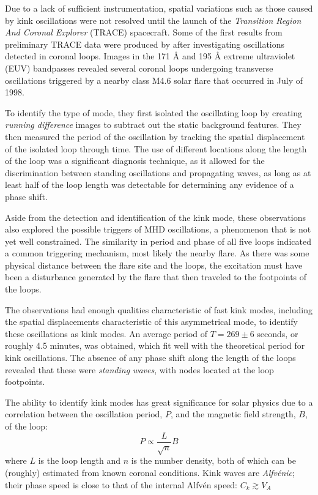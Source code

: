 \documentclass[preprint2]{aastex}
\begin{document}
Due to a lack of sufficient instrumentation,
spatial variations such as those caused by kink oscillations
were not resolved until the launch of the \emph{Transition Region And
Coronal Explorer} (TRACE) spacecraft.
Some of the first results from preliminary TRACE data were produced by
\cite{kink_1} after investigating oscillations detected in coronal loops.
Images in the 171 \AA{} and 195 \AA{} extreme ultraviolet (EUV) bandpasses
revealed several coronal loops undergoing transverse oscillations
triggered by a nearby class M4.6 solar flare that occurred in July of 1998.

To identify the type of mode, they first isolated the oscillating
loop by creating \emph{running difference} images to subtract out
the static background features. They then measured the period
of the oscillation by tracking the spatial displacement of the
isolated loop through time. The use of different locations along the
length of the loop was a significant diagnosis technique, as it
allowed for the discrimination between standing oscillations
and propagating waves, as long as at least half of the loop length
was detectable for determining any evidence of a phase shift.

Aside from the detection and identification of the kink mode,
these observations also explored the possible triggers of MHD
oscillations, a phenomenon that is not yet well constrained. The
similarity in period and phase of all five loops indicated a common
triggering mechanism, most likely the nearby flare. As there was some
physical distance between the flare site and the loops, the excitation
must have been a disturbance generated by the flare that then
traveled to the footpoints of the loops.

The observations had enough qualities characteristic of
fast kink modes, including the spatial displacements characteristic
of this asymmetrical mode, to identify these oscillations as kink modes.
An average period of $T = 269 \pm 6$ seconds, or
roughly 4.5 minutes, was obtained, which fit well with the theoretical
period for kink oscillations.
The absence of any phase
shift along the length of the loops revealed that these were
\emph{standing waves}, with nodes located at the loop footpoints.

The ability to identify kink modes has great significance
for solar physics due to a correlation between the oscillation period,
$P$, and the magnetic field strength, $B$, of the loop:
\begin{equation}
    P \propto \frac{L}{\sqrt{n}}{B}
\end{equation}
where $L$ is the loop length and $n$ is the number density,
both of which can be (roughly) estimated from known coronal conditions.
Kink waves are \emph{Alfv\'enic}; their phase speed is
close to that of the internal Alfv\'en speed:
$C_{k} \gtrsim V_{A}   $
\end{document}
